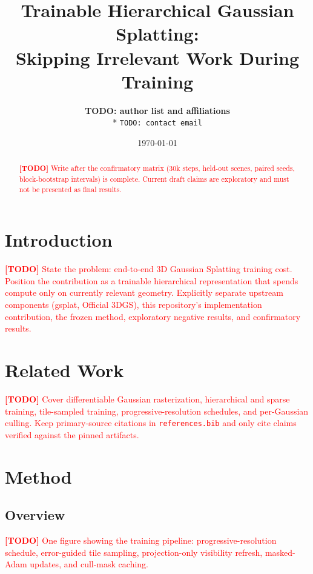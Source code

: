\documentclass[11pt,letterpaper]{article}
\title{Trainable Hierarchical Gaussian Splatting:\\Skipping Irrelevant Work During Training}
\author{%
  \textbf{TODO: author list and affiliations}\\*
  \texttt{TODO: contact email}
}
\date{\today}
\newcommand{\TODO}[1]{\textcolor{red}{\textbf{[TODO] }#1}}
\begin{document}
\maketitle

\begin{abstract}
\TODO{Write after the confirmatory matrix (30k steps, held-out scenes, paired
seeds, block-bootstrap intervals) is complete. Current draft claims are
exploratory and must not be presented as final results.}
\end{abstract}

\section{Introduction}

\label{sec:intro}

\TODO{State the problem: end-to-end 3D Gaussian Splatting training cost.
Position the contribution as a trainable hierarchical representation that
spends compute only on currently relevant geometry. Explicitly separate
upstream components (gsplat, Official 3DGS), this repository's
implementation contribution, the frozen method, exploratory negative results,
and confirmatory results.}

\section{Related Work}

\label{sec:related}

\TODO{Cover differentiable Gaussian rasterization, hierarchical and sparse
training, tile-sampled training, progressive-resolution schedules, and
per-Gaussian culling. Keep primary-source citations in
\texttt{references.bib} and only cite claims verified against the pinned
artifacts.}

\section{Method}

\label{sec:method}

\subsection{Overview}

\TODO{One figure showing the training pipeline: progressive-resolution
schedule, error-guided tile sampling, projection-only visibility refresh,
masked-Adam updates, and cull-mask caching.}
\end{document}
